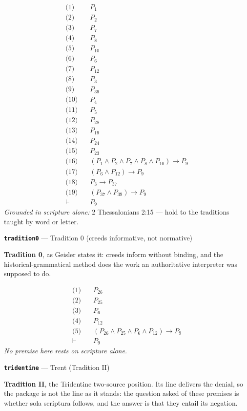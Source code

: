 \documentclass[11pt]{article}
\begin{document}
\begin{align*}
  \text{(1)} \quad & P_{1} \\
  \text{(2)} \quad & P_{2} \\
  \text{(3)} \quad & P_{7} \\
  \text{(4)} \quad & P_{8} \\
  \text{(5)} \quad & P_{10} \\
  \text{(6)} \quad & P_{6} \\
  \text{(7)} \quad & P_{12} \\
  \text{(8)} \quad & P_{3} \\
  \text{(9)} \quad & P_{39} \\
  \text{(10)} \quad & P_{4} \\
  \text{(11)} \quad & P_{5} \\
  \text{(12)} \quad & P_{28} \\
  \text{(13)} \quad & P_{19} \\
  \text{(14)} \quad & P_{24} \\
  \text{(15)} \quad & P_{23} \\
  \text{(16)} \quad & (P_{1} \land P_{2} \land P_{7} \land P_{8} \land P_{10}) \rightarrow P_{9} \\
  \text{(17)} \quad & (P_{6} \land P_{12}) \rightarrow P_{9} \\
  \text{(18)} \quad & P_{3} \rightarrow P_{37} \\
  \text{(19)} \quad & (P_{37} \land P_{39}) \rightarrow P_{9} \\
  \vdash \quad & P_{9}
\end{align*}
\emph{Grounded in scripture alone:} 2 Thessalonians 2:15 — hold to the traditions taught by word or letter.
\par\medskip\noindent\textbf{\texttt{tradition0}} --- Tradition 0 (creeds informative, not normative)\par\nobreak\noindent
\textbf{Tradition 0}, as Geisler states it: creeds inform without binding, and the historical-grammatical method does the work an authoritative interpreter was supposed to do.

\begin{align*}
  \text{(1)} \quad & P_{26} \\
  \text{(2)} \quad & P_{25} \\
  \text{(3)} \quad & P_{6} \\
  \text{(4)} \quad & P_{12} \\
  \text{(5)} \quad & (P_{26} \land P_{25} \land P_{6} \land P_{12}) \rightarrow P_{9} \\
  \vdash \quad & P_{9}
\end{align*}
\emph{No premise here rests on scripture alone.}
\par\medskip\noindent\textbf{\texttt{tridentine}} --- Trent (Tradition II)\par\nobreak\noindent
\textbf{Tradition II}, the Tridentine two-source position. Its line delivers the denial, so the package is not the line as it stands: the question asked of these premises is whether sola scriptura follows, and the answer is that they entail its negation.
\end{document}

